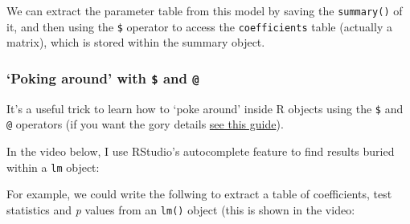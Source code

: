 \documentclass[]{article}
\newenvironment{Shaded}{\begin{snugshade}}{\end{snugshade}}
\newcommand{\ErrorTok}[1]{\textcolor[rgb]{0.64,0.00,0.00}{\textbf{#1}}}
\newcommand{\FloatTok}[1]{\textcolor[rgb]{0.00,0.00,0.81}{#1}}
\newcommand{\KeywordTok}[1]{\textcolor[rgb]{0.13,0.29,0.53}{\textbf{#1}}}
\newcommand{\NormalTok}[1]{#1}
\newcommand{\OperatorTok}[1]{\textcolor[rgb]{0.81,0.36,0.00}{\textbf{#1}}}
\newcommand{\StringTok}[1]{\textcolor[rgb]{0.31,0.60,0.02}{#1}}
\begin{document}
We can extract the parameter table from this model by saving the \texttt{summary()} of
it, and then using the \texttt{\$} operator to access the \texttt{coefficients} table (actually
a matrix), which is stored within the summary object.

\begin{Shaded}
\end{Shaded}

\hypertarget{poking-around-with-and}{%
\subsubsection*{\texorpdfstring{`Poking around' with \texttt{\$} and \texttt{@}}{`Poking around' with \$ and @}}\label{poking-around-with-and}}

It's a useful trick to learn how to `poke around' inside R objects using the \texttt{\$}
and \texttt{@} operators (if you want the gory details
\href{http://adv-r.had.co.nz/OO-essentials.html}{see this guide}).

In the video below, I use RStudio's autocomplete feature to find results buried
within a \texttt{lm} object:

For example, we could write the follwing to extract a table of coefficients,
test statistics and \emph{p} values from an \texttt{lm()} object (this is shown in the
video:
\end{document}
